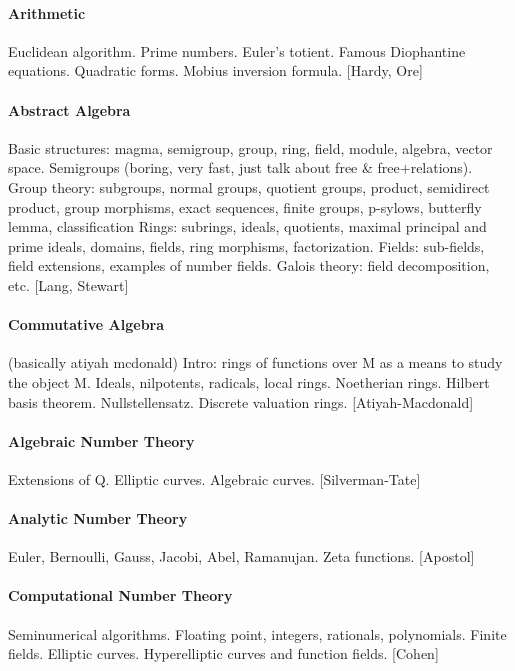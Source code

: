 \paragraph{Arithmetic}
Euclidean algorithm.
Prime numbers. Euler's totient.
Famous Diophantine equations.
Quadratic forms.
Mobius inversion formula.
[Hardy, Ore]

\paragraph{Abstract Algebra}
Basic structures: magma, semigroup, group, ring, field, module, algebra,
vector space.
Semigroups (boring, very fast, just talk about free \& free+relations).
Group theory: subgroups, normal groups, quotient groups, product, semidirect
product, group morphisms, exact sequences, finite groups, p-sylows, butterfly
lemma, classification
Rings: subrings, ideals, quotients, maximal principal and prime ideals,
domains, fields, ring morphisms, factorization.
Fields: sub-fields, field extensions, examples of number fields.
Galois theory: field decomposition, etc.
[Lang, Stewart]

\paragraph{Commutative Algebra}
(basically atiyah mcdonald)
Intro: rings of functions over M as a means to study the object M.
Ideals, nilpotents, radicals, local rings.
Noetherian rings.  Hilbert basis theorem.
Nullstellensatz.
Discrete valuation rings.
[Atiyah-Macdonald]

\paragraph{Algebraic Number Theory}
Extensions of Q.
Elliptic curves.
Algebraic curves.
[Silverman-Tate]


\paragraph{Analytic Number Theory}
Euler, Bernoulli, Gauss, Jacobi, Abel, Ramanujan.
Zeta functions.
[Apostol]

\paragraph{Computational Number Theory}
Seminumerical algorithms.  Floating point, integers, rationals, polynomials.
Finite fields.
Elliptic curves.
Hyperelliptic curves and function fields.
[Cohen]

